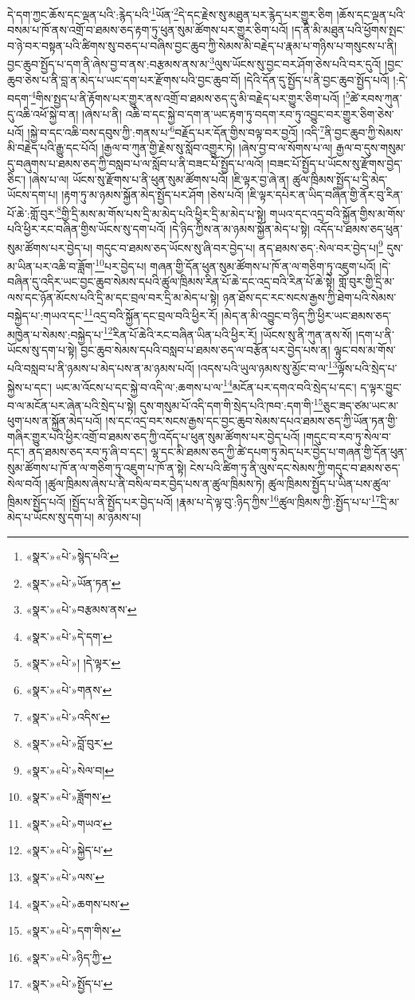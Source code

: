 དེ་དག་ཀྱང་ཆོས་དང་ལྡན་པའི་:རྙེད་པའི་\footnote{«སྣར་»«པེ་»སྙེད་པའི་}ཡོན་\footnote{«སྣར་»«པེ་»ཡོན་ཏན་}དེ་དང་རྗེས་སུ་མཐུན་པར་རྙེད་པར་གྱུར་ཅིག །ཆོས་དང་ལྡན་པའི་བསམ་པ་ཁོ་ནས་འགྲོ་བ་ཐམས་ཅད་རྟག་ཏུ་ཕུན་སུམ་ཚོགས་པར་གྱུར་ཅིག་པའོ། །ད་ནི་མི་མཐུན་པའི་ཕྱོགས་སྤང་བ་ཉེ་བར་བསྟན་པའི་ཚིགས་སུ་བཅད་པ་བཞིས་བྱང་ཆུབ་ཀྱི་སེམས་མི་བརྗེད་པ་རྣམ་པ་གཉིས་པ་གསུངས་པ་ནི། བྱང་ཆུབ་སྤྱོད་པ་དག་ནི་ཞེས་བྱ་བ་ནས་:བརྩམས་ནས་མ་\footnote{«སྣར་»«པེ་»བརྩམས་ནས་}ལུས་ཡོངས་སུ་བྱང་བར་ཤོག་ཅེས་པའི་བར་དུའོ། །བྱང་ཆུབ་ཅེས་པ་ནི་བླ་ན་མེད་པ་ཡང་དག་པར་རྫོགས་པའི་བྱང་ཆུབ་བོ། །དེའི་དོན་དུ་སྤྱོད་པ་ནི་བྱང་ཆུབ་སྤྱོད་པའོ། །:དེ་བདག་\footnote{«སྣར་»«པེ་»དེ་དག་}གིས་སྤྱད་པ་ནི་རྟོགས་པར་གྱུར་ནས་འགྲོ་བ་ཐམས་ཅད་དུ་མི་བརྗེད་པར་གྱུར་ཅིག་པའོ། །\footnote{«སྣར་»«པེ་»། །དེ་ལྟར་}ཚེ་རབས་ཀུན་དུ་འཆི་འཕོ་སྐྱེ་བ་ན། །ཞེས་པ་ནི། འཆི་བ་དང་སྐྱེ་བ་དག་ན་ཡང་རྟག་ཏུ་བདག་རབ་ཏུ་འབྱུང་བར་གྱུར་ཅིག་ཅེས་པའོ། །སྐྱེ་བ་དང་འཆི་བས་དབུས་ཀྱི་:གནས་པ་\footnote{«སྣར་»«པེ་»གནས་}བརྗོད་པར་དོན་གྱིས་བལྟ་བར་བྱའོ། །འདི་\footnote{«སྣར་»«པེ་»འདིས་}ནི་བྱང་ཆུབ་ཀྱི་སེམས་མི་བརྗེད་པའི་རྒྱུ་དང་པོའོ། །རྒྱལ་བ་ཀུན་གྱི་རྗེས་སུ་སློབ་འགྱུར་ཏེ། །ཞེས་བྱ་བ་ལ་སོགས་པ་ལ། རྒྱལ་བ་དུས་གསུམ་དུ་བཞུགས་པ་ཐམས་ཅད་ཀྱི་བསླབ་པ་ལ་སློབ་པ་ནི་བཟང་པོ་སྤྱོད་པ་ལའོ། །བཟང་པོ་སྤྱོད་པ་ཡོངས་སུ་རྫོགས་བྱེད་ཅིང་། །ཞེས་པ་ལ། ཡོངས་སུ་རྫོགས་པ་ནི་ཕུན་སུམ་ཚོགས་པའོ། །ཇི་ལྟར་བྱ་ཞེ་ན། ཚུལ་ཁྲིམས་སྤྱོད་པ་དྲི་མེད་ཡོངས་དག་པ། །རྟག་ཏུ་མ་ཉམས་སྐྱོན་མེད་སྤྱོད་པར་ཤོག །ཅེས་པའོ། །ཇི་ལྟར་དཔེར་ན་ཡིད་བཞིན་གྱི་ནོར་བུ་རིན་པོ་ཆེ་:གློ་བུར་\footnote{«སྣར་»«པེ་»བློ་བུར་}གྱི་དྲི་མས་མ་གོས་པས་དྲི་མ་མེད་པའི་ཕྱིར་དྲི་མ་མེད་པ་སྟེ། གཡའ་དང་འདྲ་བའི་སྐྱོན་གྱིས་མ་གོས་པའི་ཕྱིར་རང་བཞིན་གྱིས་ཡོངས་སུ་དག་པའོ། །དེ་ཉིད་ཀྱིས་ན་མ་ཉམས་སྐྱོན་མེད་པ་སྟེ། འདོད་པ་ཐམས་ཅད་ཕུན་སུམ་ཚོགས་པར་བྱེད་པ། གདུང་བ་ཐམས་ཅད་ཡོངས་སུ་ཞི་བར་བྱེད་པ། ནད་ཐམས་ཅད་:སེལ་བར་བྱེད་པ།\footnote{«སྣར་»«པེ་»སེལ་བ།} དུས་མ་ཡིན་པར་འཆི་བ་ཟློག་\footnote{«སྣར་»«པེ་»ཟློགས་}པར་བྱེད་པ། གཞན་གྱི་དོན་ཕུན་སུམ་ཚོགས་པ་ཁོ་ན་ལ་གཅིག་ཏུ་འཇུག་པའོ། །དེ་བཞིན་དུ་འདིར་ཡང་བྱང་ཆུབ་སེམས་དཔའི་ཚུལ་ཁྲིམས་རིན་པོ་ཆེ་དང་འདྲ་བའི་རིན་པོ་ཆེ་སྟེ། གློ་བུར་གྱི་དྲི་མ་ལས་དང་ཉོན་མོངས་པའི་དྲི་མ་དང་བྲལ་བར་དྲི་མ་མེད་པ་སྟེ། ཉན་ཐོས་དང་རང་སངས་རྒྱས་ཀྱི་ཐེག་པའི་སེམས་བསྐྱེད་པ་:གཡའ་དང་\footnote{«སྣར་»«པེ་»གཡའ་}འདྲ་བའི་སྐྱོན་དང་བྲལ་བའི་ཕྱིར་རོ། །མེད་ན་མི་འབྱུང་བ་ཉིད་ཀྱི་ཕྱིར་ཡང་ཐམས་ཅད་མཁྱེན་པ་སེམས་:བསྐྱེད་པ་\footnote{«སྣར་»«པེ་»སྐྱེད་པ་}རིན་པོ་ཆེའི་རང་བཞིན་ཡིན་པའི་ཕྱིར་རོ། །ཡོངས་སུ་ནི་ཀུན་ནས་སོ། །དག་པ་ནི་ཡོངས་སུ་དག་པ་སྟེ། བྱང་ཆུབ་སེམས་དཔའི་བསླབ་པ་ཐམས་ཅད་ལ་བརྩོན་པར་བྱེད་པས་ན། ལྟུང་བས་མ་གོས་པའི་བསླབ་པ་ནི་ཉམས་པ་མེད་པས་ན་མ་ཉམས་པའོ། །འདས་པའི་ཡུལ་ཉམས་སུ་མྱོང་བ་ལ་\footnote{«སྣར་»«པེ་»ལས་}ལྟོས་པའི་སྲེད་པ་སྐྱེས་པ་དང་། ཡང་མ་འོངས་པ་དང་སྐྱེ་བ་འདི་ལ་:ཆགས་པ་ལ་\footnote{«སྣར་»«པེ་»ཆགས་པས་}མངོན་པར་དགའ་བའི་སྲེད་པ་དང་། ད་ལྟར་བྱུང་བ་ལ་མངོན་པར་ཞེན་པའི་སྲེད་པ་སྟེ། དུས་གསུམ་པོ་འདི་དག་གི་སྲེད་པའི་ཁབ་:དག་གི་\footnote{«སྣར་»«པེ་»དག་གིས་}ཅུང་ཟད་ཙམ་ཡང་མ་ཕུག་པས་ན་སྐྱོན་མེད་པའོ། །ས་དང་འདྲ་བར་སངས་རྒྱས་དང་བྱང་ཆུབ་སེམས་དཔའ་ཐམས་ཅད་ཀྱི་ཡོན་ཏན་གྱི་གཞིར་གྱུར་པའི་ཕྱིར་འགྲོ་བ་ཐམས་ཅད་ཀྱི་འདོད་པ་ཕུན་སུམ་ཚོགས་པར་བྱེད་པའོ། །གདུང་བ་རབ་ཏུ་སེལ་བ་དང་། ནད་ཐམས་ཅད་རབ་ཏུ་ཞི་བ་དང་། ལྷ་དང་མི་ཐམས་ཅད་ཀྱི་ཚེ་དཔག་ཏུ་མེད་པར་བྱེད་པ་གཞན་གྱི་དོན་ཕུན་སུམ་ཚོགས་པ་ཁོ་ན་ལ་གཅིག་ཏུ་འཇུག་པ་ཁོ་ན་སྟེ། ངེས་པའི་ཚིག་ཏུ་ནི་ལུས་དང་སེམས་ཀྱི་གདུང་བ་ཐམས་ཅད་སེལ་བའོ། །ཚུལ་ཁྲིམས་ཞེས་པ་ནི་བསིལ་བར་བྱེད་པས་ན་ཚུལ་ཁྲིམས་ཏེ། ཚུལ་ཁྲིམས་སྤྱོད་པ་ཡིན་པས་ཚུལ་ཁྲིམས་སྤྱོད་པའོ། །སྤྱོད་པ་ནི་སྤྱོད་པར་བྱེད་པའོ། །རྣམ་པ་དེ་ལྟ་བུ་:ཉིད་ཀྱིས་\footnote{«སྣར་»«པེ་»ཉིད་ཀྱི་}ཚུལ་ཁྲིམས་ཀྱི་:སྤྱོད་པ་པ་\footnote{«སྣར་»«པེ་»སྤྱོད་པ་}དྲི་མ་མེད་པ་ཡོངས་སུ་དག་པ། མ་ཉམས་པ། 
